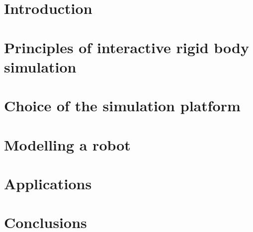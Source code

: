 \documentclass[12pt,a4paper,twoside]{report}
\begin{document}


\tableofcontents

\listoffigures

\listoftables

\clearpage
\setcounter{page}{1}
\chapter{Introduction}


\chapter{Principles of interactive rigid body simulation}
\label{chap:principles}


\chapter{Choice of the simulation platform}
\label{chap:choice}


\chapter{Modelling a robot}
\label{chap:modelling}


\chapter{Applications}
\label{chap:simulation}


\chapter{Conclusions}
\label{chap:conclusion}





\appendix

\end{document}
